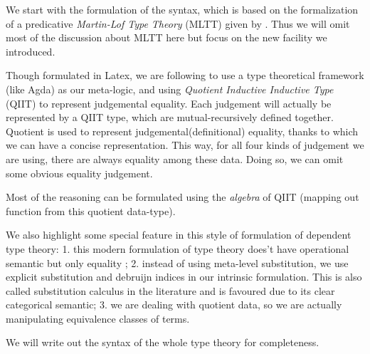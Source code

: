 
We start with the formulation of the syntax, which is based on the formalization of a predicative \textit{Martin-Lof Type Theory} (MLTT) given by \citep{coquand2018canonicity}. Thus we will omit most of the discussion about MLTT here but focus on the new facility we introduced. 

Though formulated in Latex, we are following \citep{kaposi2017type} to use a type theoretical framework (like Agda) as our meta-logic, 
and using \textit{Quotient Inductive Inductive Type} (QIIT) to represent judgemental equality. Each judgement will actually be represented by a QIIT type, which are mutual-recursively defined together. Quotient is used to represent judgemental(definitional) equality, thanks to which we can have a concise representation. This way, for all four kinds of judgement we are using, there are always equality among these data. Doing so, we can omit some obvious equality judgement. 

Most of the reasoning can be formulated using the \textit{algebra} of QIIT (mapping out function from this quotient data-type). 

We also highlight some special feature in this style of formulation of dependent type theory: 1. this modern formulation of type theory does't have operational semantic but only equality 
;
2. instead of using meta-level substitution, we use explicit substitution and debruijn indices in our intrinsic formulation. This is also called substitution calculus in the literature and is favoured due to its clear categorical semantic; 
3. we are dealing with quotient data, so we are actually manipulating equivalence classes of terms. 

We will write out the syntax of the whole type theory for completeness.


\newcommand{\denotes}[1]{{\llbracket {#1} \rrbracket}}
\newcommand{\goodCtx}[2]{{ {#1} \ ok }}
\newcommand{\goodType}[3]{{ {#1} \vdash {#2} }}
\newcommand{\goodTerm}[3]{{ {#1} \vdash {#2} : {#3} }}
\newcommand{\goodSub}[3]{{ {#1} \vdash {#2} : {#3} }}
\newcommand{\goodSig}[3]{{ {#1} \vdash {#2} \ \  Sig^{#3} }}
\newcommand{\goodWSig}[3]{{ {#1} \vdash {#2} \ \ WSig^{#3} }}
\newcommand{\goodSeal}[4]{{ {#1} \vdash {#2} : {#3} \  |\  {#4} }}
\newcommand{\goodInh}[3]{{ {#1} \vdash {#2} \twoheadrightarrow {#3}}}
\newcommand{\nat}{\mathbf{N}}

\newcommand{\cU}{{\mathcal{U}}}
\newcommand{\cB}{{\mathbb{B}}}
\newcommand{\cL}{{\mathcal{L}}}


